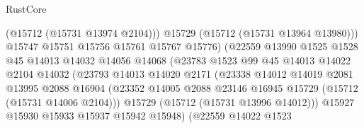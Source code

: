 \begin{lexlean}{RustCore}
\begin{coremodule}
                                        (@15712 (@15731 @13974 @2104)))
                                      @15729
                                      (@15712 (@15731 @13964 @13980)))
                                    @15747
                                    @15751
                                    @15756
                                    @15761
                                    @15767
                                    @15776)
                                  (@22559
                                    @13990
                                    @1525
                                    @1528
                                    @45
                                    @14013
                                    @14032
                                    @14056
                                    @14068
                                    (@23783
                                      @1523
                                      @99
                                      @45
                                      @14013
                                      @14022
                                      @2104
                                      @14032
                                      (@23793
                                        @14013
                                        @14020
                                        @2171
                                        (@23338
                                          @14012
                                          @14019
                                          @2081
                                          @13995
                                          @2088
                                          @16904
                                          (@23352
                                            @14005
                                            @2088
                                            @23146
                                            @16945
                                            @15729
                                            (@15712 (@15731 @14006 @2104)))
                                          @15729
                                          (@15712 (@15731 @13996 @14012)))
                                        @15927
                                        @15930
                                        @15933
                                        @15937
                                        @15942
                                        @15948)
                                      (@22559
                                        @14022
                                        @1523

\end{coremodule}
\end{lexlean}
